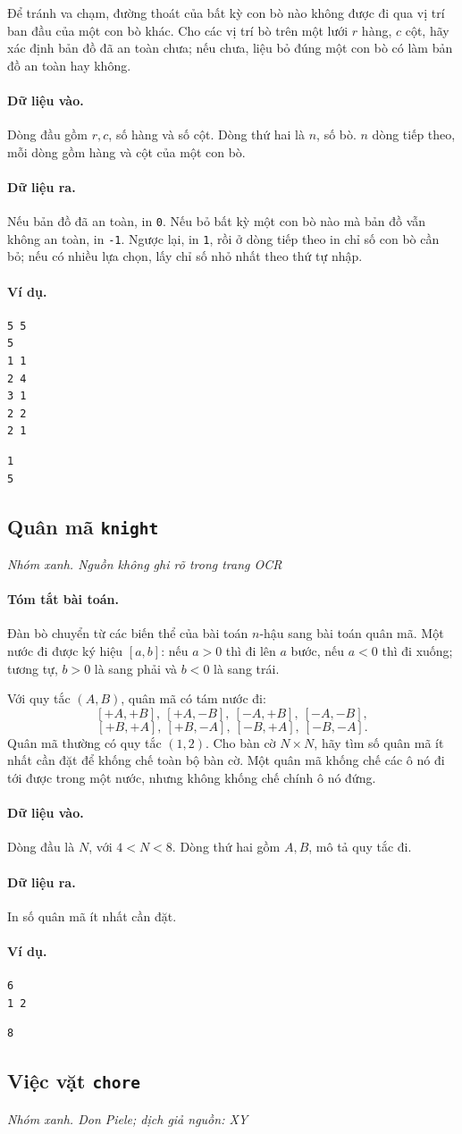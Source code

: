 \documentclass[11pt]{article}
\newcommand{\problem}[4]{%
  \subsection[#1 (#2)]{#1 \hfill {\normalsize\texttt{#2}}}%
  \noindent\textit{#3. #4}\par\smallskip
}
\newcommand{\iosec}[1]{\paragraph{#1}}
\begin{document}
Để tránh va chạm, đường thoát của bất kỳ con bò nào không được đi qua vị trí
ban đầu của một con bò khác. Cho các vị trí bò trên một lưới \(r\) hàng,
\(c\) cột, hãy xác định bản đồ đã an toàn chưa; nếu chưa, liệu bỏ đúng một con
bò có làm bản đồ an toàn hay không.

\iosec{Dữ liệu vào.}
Dòng đầu gồm \(r,c\), số hàng và số cột. Dòng thứ hai là \(n\), số bò. \(n\)
dòng tiếp theo, mỗi dòng gồm hàng và cột của một con bò.

\iosec{Dữ liệu ra.}
Nếu bản đồ đã an toàn, in \texttt{0}. Nếu bỏ bất kỳ một con bò nào mà bản đồ
vẫn không an toàn, in \texttt{-1}. Ngược lại, in \texttt{1}, rồi ở dòng tiếp
theo in chỉ số con bò cần bỏ; nếu có nhiều lựa chọn, lấy chỉ số nhỏ nhất theo
thứ tự nhập.

\iosec{Ví dụ.}
\begin{verbatim}
5 5
5
1 1
2 4
3 1
2 2
2 1
\end{verbatim}

\begin{verbatim}
1
5
\end{verbatim}

\problem{Quân mã}{knight}{Nhóm xanh}{Nguồn không ghi rõ trong trang OCR}

\iosec{Tóm tắt bài toán.}
Đàn bò chuyển từ các biến thể của bài toán \(n\)-hậu sang bài toán quân mã.
Một nước đi được ký hiệu \([a,b]\): nếu \(a>0\) thì đi lên \(a\) bước, nếu
\(a<0\) thì đi xuống; tương tự, \(b>0\) là sang phải và \(b<0\) là sang trái.

Với quy tắc \((A,B)\), quân mã có tám nước đi:
\[
[+A,+B],\ [+A,-B],\ [-A,+B],\ [-A,-B],
\]
\[
[+B,+A],\ [+B,-A],\ [-B,+A],\ [-B,-A].
\]
Quân mã thường có quy tắc \((1,2)\). Cho bàn cờ \(N\times N\), hãy tìm số
quân mã ít nhất cần đặt để khống chế toàn bộ bàn cờ. Một quân mã khống chế các
ô nó đi tới được trong một nước, nhưng không khống chế chính ô nó đứng.

\iosec{Dữ liệu vào.}
Dòng đầu là \(N\), với \(4<N<8\). Dòng thứ hai gồm \(A,B\), mô tả quy tắc đi.

\iosec{Dữ liệu ra.}
In số quân mã ít nhất cần đặt.

\iosec{Ví dụ.}
\begin{verbatim}
6
1 2
\end{verbatim}

\begin{verbatim}
8
\end{verbatim}

\problem{Việc vặt}{chore}{Nhóm xanh}{Don Piele; dịch giả nguồn: XY}
\end{document}
